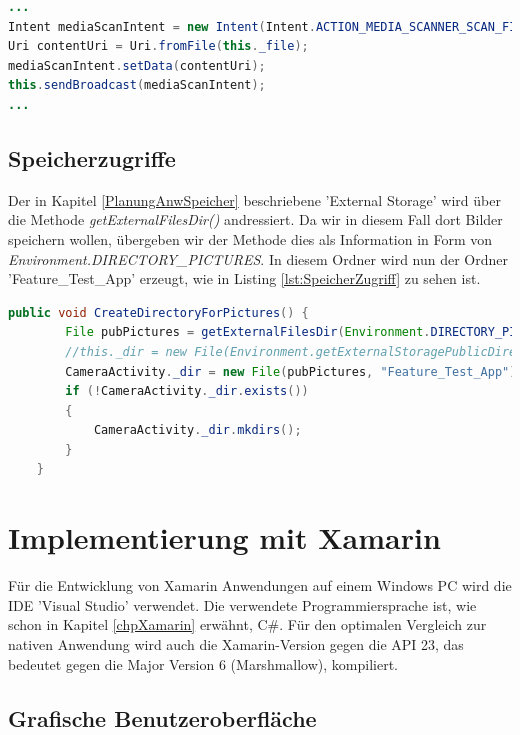 \begin{lstlisting}[caption=Bereitstellen des gespeicherten Bildes für die Android \textit{Gallery}, label=lst:AndroidGallery, language=Java]
...
Intent mediaScanIntent = new Intent(Intent.ACTION_MEDIA_SCANNER_SCAN_FILE);
Uri contentUri = Uri.fromFile(this._file);
mediaScanIntent.setData(contentUri);
this.sendBroadcast(mediaScanIntent);
...
\end{lstlisting}  

\subsection*{Speicherzugriffe}

Der in Kapitel \ref{PlanungAnwSpeicher} beschriebene 'External Storage' wird über die Methode \textit{getExternalFilesDir()} andressiert. Da wir in diesem Fall dort Bilder speichern wollen, übergeben wir der Methode dies als Information in Form von \textit{Environment.DIRECTORY\_PICTURES}. In diesem Ordner wird nun der Ordner 'Feature\_Test\_App' erzeugt, wie in Listing \ref{lst:SpeicherZugriff} zu sehen ist.
\clearpage

\begin{lstlisting}[caption=Adressieren des 'External Storage' und Anlegen eines Ordners für die Fotos der Funktionstest-Anwendung, label=lst:SpeicherZugriff, language=Java]
public void CreateDirectoryForPictures() {
        File pubPictures = getExternalFilesDir(Environment.DIRECTORY_PICTURES);
        //this._dir = new File(Environment.getExternalStoragePublicDirectory(Environment.DIRECTORY_PICTURES), "FeatureTestApp");
        CameraActivity._dir = new File(pubPictures, "Feature_Test_App");
        if (!CameraActivity._dir.exists())
        {
            CameraActivity._dir.mkdirs();
        }
    }
\end{lstlisting}

\section{Implementierung mit Xamarin}

Für die Entwicklung von Xamarin Anwendungen auf einem Windows PC wird die IDE 'Visual Studio' verwendet. Die verwendete Programmiersprache ist, wie schon in Kapitel \ref{chpXamarin} erwähnt, C\#. Für den optimalen Vergleich zur nativen Anwendung wird auch die Xamarin-Version gegen die API 23, das bedeutet gegen die Major Version 6 (Marshmallow), kompiliert. 

\subsection*{Grafische Benutzeroberfläche}

